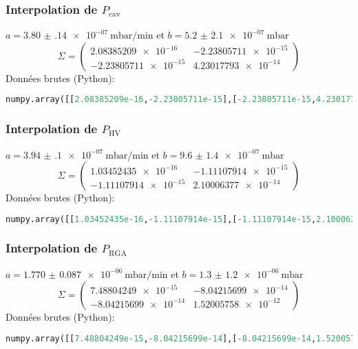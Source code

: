 \subsubsection{Interpolation de $P_\text{cav}$}
$a = \SI{+3.80(14)e-07}{\milli\bar\per\minute}$ et $b = \SI{+5.2(21)e-07}{\milli\bar}$
\[
\Sigma = \left(
\begin{matrix}
\num{2.08385209e-16} & \num{-2.23805711e-15}\\
\num{-2.23805711e-15} & \num{4.23017793e-14}
\end{matrix}\right)
\]
Données brutes (Python):
\begin{lstlisting}[language = Python]
numpy.array([[2.08385209e-16,-2.23805711e-15],[-2.23805711e-15,4.23017793e-14]])
\end{lstlisting}

\subsubsection{Interpolation de $P_\text{HV}$}
$a = \SI{+3.94(10)e-07}{\milli\bar\per\minute}$ et $b = \SI{+9.6(14)e-07}{\milli\bar}$
\[
\Sigma = \left(
\begin{matrix}
\num{1.03452435e-16} & \num{-1.11107914e-15}\\
\num{-1.11107914e-15} & \num{2.10006377e-14}
\end{matrix}\right)
\]
Données brutes (Python):
\begin{lstlisting}[language = Python]
numpy.array([[1.03452435e-16,-1.11107914e-15],[-1.11107914e-15,2.10006377e-14]])
\end{lstlisting}

\subsubsection{Interpolation de $P_\text{RGA}$}
$a = \SI{+1.770(87)e-06}{\milli\bar\per\minute}$ et $b = \SI{+1.3(12)e-06}{\milli\bar}$
\[
\Sigma = \left(
\begin{matrix}
\num{7.48804249e-15} & \num{-8.04215699e-14}\\
\num{-8.04215699e-14} & \num{1.52005758e-12}
\end{matrix}\right)
\]
Données brutes (Python):
\begin{lstlisting}[language = Python]
numpy.array([[7.48804249e-15,-8.04215699e-14],[-8.04215699e-14,1.52005758e-12]])
\end{lstlisting}


